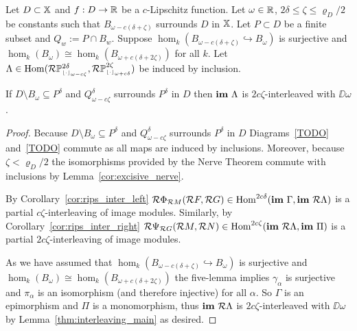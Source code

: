 \begin{theorem}\label{thm:interleaving_main_2}
  Let $D\subset\mathbb{X}$ and $f : D\to\mathbb{R}$ be a $c$-Lipschitz function.
  Let $\omega\in\mathbb{R}$, $2\delta\leq\zeta\leq\varrho_D/2$ be constants such that $B_{\omega-c(\delta+\zeta)}$ surrounds $D$ in $\mathbb{X}$.
  Let $P\subset D$ be a finite subset and $Q_w := P\cap B_w$.
  Suppose $\hom_k(B_{\omega-c(\delta+\zeta)}\hookrightarrow B_\omega)$ is surjective and $\hom_k(B_\omega)\cong\hom_k(B_{\omega+c(\delta+2\zeta)})$ for all $k$.
  Let $\Lambda\in\mathrm{Hom}(\mathcal{R}\mathbb{P}_{\scriptscriptstyle \lfloor\cdot\rfloor_{\omega-c\zeta}}^{2\delta}, \mathcal{R}\mathbb{P}_{\scriptscriptstyle \lfloor\cdot\rfloor_{\omega+c\delta}}^{2\zeta})$ be induced by inclusion.

  If $D\setminus B_\omega\subseteq P^\delta$ and $Q_{\omega-c\zeta}^\delta$ surrounds $P^\delta$ in $D$ then $\mathbf{im}~\Lambda$ is $2c\zeta$-interleaved with $\DD{\omega}$.
\end{theorem}
\begin{proof}
  Because $D\setminus B_\omega\subseteq P^\delta$ and $Q_{\omega-c\zeta}^\delta$ surrounds $P^\delta$ in $D$ Diagrams~\ref{TODO} and~\ref{TODO} commute as all maps are induced by inclusions.
  Moreover, because $\zeta < \varrho_D/2$ the isomorphisms provided by the Nerve Theorem commute with inclusions by Lemma~\ref{cor:excisive_nerve}.

  By Corollary~\ref{cor:rips_inter_left} $\mathcal{R} \Phi_{\mathcal{R} M}(\mathcal{R} F, \mathcal{R} G)\in\mathrm{Hom}^{2c\delta}(\mathbf{im}~\Gamma,\mathbf{im}~\mathcal{R}\Lambda)$ is a partial $c\zeta$-interleaving of image modules.
  Similarly, by Corollary~\ref{cor:rips_inter_right} $\mathcal{R} \Psi_{\mathcal{R} G} (\mathcal{R} M,\mathcal{R} N)\in\mathrm{Hom}^{2c\zeta}(\mathbf{im}~\mathcal{R}\Lambda, \mathbf{im}~\Pi)$ is a partial $2c\zeta$-interleaving of image modules.

  As we have assumed that $\hom_k(B_{\omega-c(\delta+\zeta)}\hookrightarrow B_\omega)$ is surjective and $\hom_k(B_\omega)\cong\hom_k(B_{\omega+c(\delta+2\zeta)})$ the five-lemma implies $\gamma_\alpha$ is surjective and $\pi_\alpha$ is an isomorphism (and therefore injective) for all $\alpha$.
  So $\Gamma$ is an epimorphism and $\Pi$ is a monomorphism, thus $\mathbf{im}~\mathcal{R}\Lambda$ is $2c\zeta$-interleaved with $\DD{\omega}$ by Lemma~\ref{thm:interleaving_main} as desired.
\end{proof}
